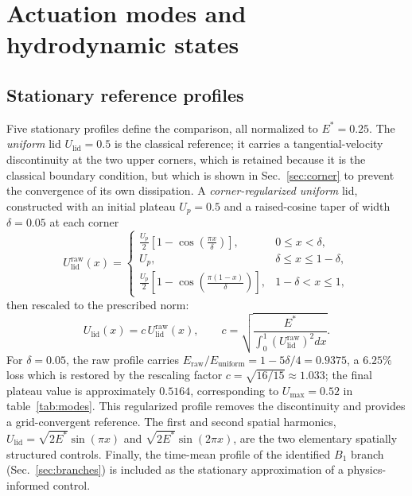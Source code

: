 \documentclass[11pt,a4paper]{article}
\begin{document}
\section{Actuation modes and hydrodynamic states}
\label{sec:modes}

\subsection{Stationary reference profiles}

Five stationary profiles define the comparison, all normalized to
$E^\ast=0.25$. The \emph{uniform} lid $U_{\mathrm{lid}}=0.5$ is the classical
reference; it carries a tangential-velocity discontinuity at the two
upper corners, which is retained because it is the classical boundary condition,
but which is shown in Sec.~\ref{sec:corner} to prevent the convergence of its own
dissipation. A \emph{corner-regularized uniform} lid, constructed with an initial
plateau $U_p=0.5$ and a raised-cosine taper of width $\delta=0.05$ at each corner
\begin{equation}
U_{\mathrm{lid}}^{\mathrm{raw}}(x)=
\begin{cases}
\displaystyle
\frac{U_p}{2}
\left[1-\cos\!\left(\frac{\pi x}{\delta}\right)\right],
& 0\leq x<\delta,\\[6pt]
U_p,
& \delta\leq x\leq 1-\delta,\\[6pt]
\displaystyle
\frac{U_p}{2}
\left[1-\cos\!\left(\frac{\pi(1-x)}{\delta}\right)\right],
& 1-\delta<x\leq 1,
\end{cases}
\label{eq:taper}
\end{equation}
then rescaled to the prescribed norm:
\begin{equation}
U_{\mathrm{lid}}(x)=c\,U_{\mathrm{lid}}^{\mathrm{raw}}(x),
\qquad
c=
\sqrt{
\frac{E^\ast}
{\displaystyle\int_0^1
\left(U_{\mathrm{lid}}^{\mathrm{raw}}\right)^2 dx}
}.
\end{equation}
For $\delta=0.05$, the raw profile carries $E_{\mathrm{raw}}/E_{\mathrm{uniform}}
=1-5\delta/4=0.9375$, a $6.25\%$ loss which is restored by the rescaling factor
$c=\sqrt{16/15}\approx 1.033$; the final plateau value is approximately $0.5164$,
corresponding to $U_{\max}=0.52$ in table~\ref{tab:modes}. This regularized
profile removes the discontinuity and provides a grid-convergent reference. The first and second spatial harmonics,
$U_{\mathrm{lid}}=\sqrt{2E^\ast}\sin(\pi x)$ and
$\sqrt{2E^\ast}\sin(2\pi x)$, are the two elementary spatially structured
controls. Finally, the time-mean profile of the identified $B_1$ branch
(Sec.~\ref{sec:branches}) is included as the stationary approximation of a
physics-informed control.
\end{document}
